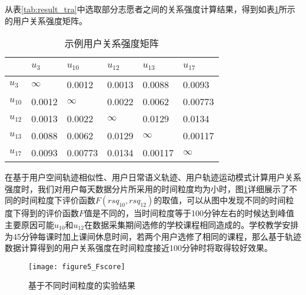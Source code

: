 \par 从表\ref{tab:result_tra}中选取部分志愿者之间的关系强度计算结果，得到如表\ref{tra_matrix}所示的用户关系强度矩阵。
\begin{table}[htbp]
\caption{示例用户关系强度矩阵}
\label{tra_matrix}
	\centering
    \begin{tabular}{|p{1.3cm}|p{1.3cm}|p{1.3cm}|p{1.3cm}|p{1.3cm}|p{1.3cm}|}
    \toprule[1.5pt]
    \hline
           ~ & $u_{3}$ & $u_{10}$ & $u_{12}$ & $u_{13}$ & $u_{17}$ \\
    \hline
     $u_{3}$ & $\infty $ & 0.0012 & 0.0013 & 0.0088 & 0.0093\\
     \hline
    $u_{10}$ & 0.0012& $\infty $  & 0.0022 & 0.0062 & 0.00773 \\
    \hline
    $u_{12}$ & 0.0013 & 0.0022 & $\infty $  & 0.0129 & 0.0134 \\
    \hline
    $u_{13}$ & 0.0088 & 0.0062 & 0.0129 & $\infty $  & 0.00117 \\
    \hline
    $u_{17}$ & 0.0093 & 0.00773 & 0.0134 & 0.00117 & $\infty $  \\
    \hline
    \end{tabular}
\end{table}

\par 在基于用户空间轨迹相似性、用户日常语义轨迹、用户轨迹运动模式计算用户关系强度时，我们对用户每天数据分片所采用的时间粒度均为小时，图\ref{fig:timeslice}详细展示了不同的时间粒度下评价函数$F(rsq_{10},rsq_{12})$的取值，可以从图中发现不同的时间粒度下得到的评价函数$F$值是不同的，当时间粒度等于100分钟左右的时候达到峰值主要原因可能$u_{10}$和$u_{12}$在数据采集期间选修的学校课程相同造成的。学校教学安排为45分钟每课时加上课间休息时间，若两个用户选修了相同的课程，那么基于轨迹数据计算得到的用户关系强度在时间粒度接近100分钟时将取得较好效果。
\begin{figure}[htb]
\centering
\texttt{[image: figure5\_Fscore]}
\caption{基于不同时间粒度的实验结果}
\label{fig:timeslice}
\end{figure}

